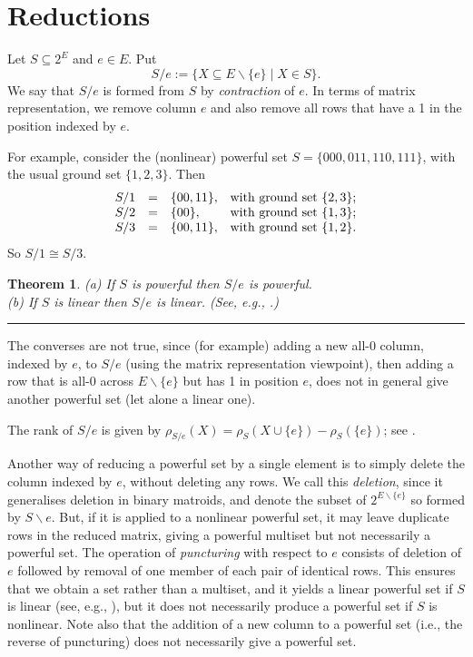 \documentclass[12pt]{article}
\newtheorem{thm}{Theorem}[section]
\def\qed{\hfill \rule{4pt}{7pt}}
\begin{document}


\section{Reductions}
\label{sec:reductions}

Let $S\subseteq2^E$ and $e\in E$.  Put
\[
S/e := \{ X\subseteq E\backslash\{e\} \mid X\in S \} .
\]
We say that $S/e$ is formed from $S$ by \textit{contraction} of $e$.
In terms of matrix representation, we remove column $e$ and also remove
all rows that have a 1 in the position indexed by $e$.

For example, consider the (nonlinear) powerful set $S = \{000, 011, 110, 111\}$, with
the usual ground set $\{1,2,3\}$.  Then
\[
\begin{array}{ccll}
S/1  & = &  \{00, 11\},  &  \hbox{with ground set $\{2,3\}$};   \\
S/2  & = &  \{00\},  &    \hbox{with ground set $\{1,3\}$};   \\
S/3  & = &  \{00, 11\},  &    \hbox{with ground set $\{1,2\}$}.
\end{array}
\]
So $S/1\cong S/3$.

\begin{thm}\label{contraction}
(a) If $S$ is powerful then $S/e$ is powerful.   \\
(b) If $S$ is linear then $S/e$ is linear.  (See, e.g., \cite[Theorem 9.3.1]{welsh76}.)
\qed
\end{thm}

The converses are not true, since (for example) adding a new all-0 column, indexed by $e$,
to $S/e$ (using the matrix representation viewpoint), then adding a row that is all-0 across
$E\backslash\{e\}$ but has 1 in position $e$, does not in general give another powerful set
(let alone a linear one).

The rank of $S/e$ is given by $\rho_{S/e}(X)=\rho_S(X\cup\{e\})-\rho_S(\{e\})$;
see \cite[\S4]{farr93}.

Another way of reducing a powerful set by a single element is to simply
delete the column indexed by $e$, without deleting any rows.
We call this \textit{deletion}, since it generalises deletion in binary matroids, and
denote the subset of $2^{E\backslash\{e\}}$ so formed by $S\backslash e$.
But, if it is applied to a nonlinear powerful set, it may leave duplicate rows in the reduced matrix,
giving a powerful multiset but not necessarily a powerful set.  The operation of \textit{puncturing}
with respect to $e$ consists of deletion of $e$ followed by removal of one member of each
pair of identical rows.  This ensures that we obtain a set rather than a multiset, and it yields a
linear powerful set if $S$ is linear (see, e.g., \cite{welsh76}), but it does
not necessarily produce a powerful set if $S$ is nonlinear.
Note also that the addition of a new column to a powerful set (i.e., the reverse of puncturing)
does not necessarily give a powerful set.
\end{document}

